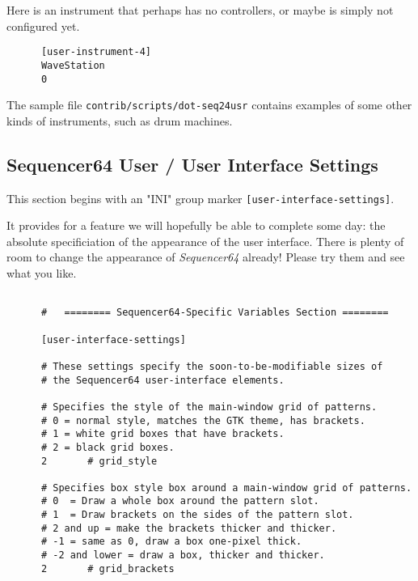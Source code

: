    Here is an instrument that perhaps has no controllers, or maybe is simply
   not configured yet.

   \begin{verbatim}
      [user-instrument-4]
      WaveStation
      0
   \end{verbatim}

   The sample file \texttt{contrib/scripts/dot-seq24usr} contains examples
   of some other kinds of instruments, such as drum machines.

\subsection{Sequencer64 User / User Interface Settings}
\label{subsec:seq64_usr_file_user_interface_settings}

   This section begins with an
   "INI" group marker \texttt{[user-interface-settings]}.

   It provides for a feature we will hopefully be able to complete some day:
   the absolute specificiation of the appearance of the user interface.
   There is plenty of room to change the appearance of
   \textsl{Sequencer64} already!  Please try them and see what you like.

   \begin{verbatim}

      #   ======== Sequencer64-Specific Variables Section ========

      [user-interface-settings]

      # These settings specify the soon-to-be-modifiable sizes of
      # the Sequencer64 user-interface elements.

      # Specifies the style of the main-window grid of patterns.
      # 0 = normal style, matches the GTK theme, has brackets.
      # 1 = white grid boxes that have brackets.
      # 2 = black grid boxes.
      2       # grid_style

      # Specifies box style box around a main-window grid of patterns.
      # 0  = Draw a whole box around the pattern slot.
      # 1  = Draw brackets on the sides of the pattern slot.
      # 2 and up = make the brackets thicker and thicker.
      # -1 = same as 0, draw a box one-pixel thick.
      # -2 and lower = draw a box, thicker and thicker.
      2       # grid_brackets
   \end{verbatim}

